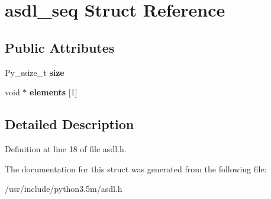 \hypertarget{structasdl__seq}{}\section{asdl\+\_\+seq Struct Reference}
\label{structasdl__seq}
\subsection*{Public Attributes}
\begin{DoxyCompactItemize}
\item 
Py\+\_\+ssize\+\_\+t {\bfseries size}\hypertarget{structasdl__seq_a3f11e0e5f53edb11ff8fef6e651a2c43}{}\label{structasdl__seq_a3f11e0e5f53edb11ff8fef6e651a2c43}

\item 
void $\ast$ {\bfseries elements} \mbox{[}1\mbox{]}\hypertarget{structasdl__seq_a44dec4611ce8805355073ab64acf4c9c}{}\label{structasdl__seq_a44dec4611ce8805355073ab64acf4c9c}

\end{DoxyCompactItemize}


\subsection{Detailed Description}


Definition at line 18 of file asdl.\+h.



The documentation for this struct was generated from the following file\+:\begin{DoxyCompactItemize}
\item 
/usr/include/python3.\+5m/asdl.\+h\end{DoxyCompactItemize}
